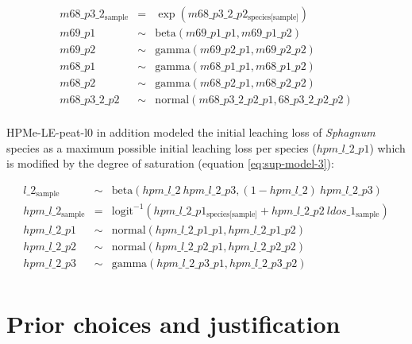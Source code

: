 \documentclass[
  12pt,
]{article}
\begin{document}
\begin{equation}
\begin{aligned}
m68\_p3\_2_{\text{sample}} & = & \exp(m68\_p3\_2\_p2_{\text{species[sample]}})\\
m69\_p1 & \sim & \text{beta}(m69\_p1\_p1, m69\_p1\_p2)\\
m69\_p2 & \sim & \text{gamma}(m69\_p2\_p1, m69\_p2\_p2)\\
m68\_p1 & \sim & \text{gamma}(m68\_p1\_p1, m68\_p1\_p2)\\
m68\_p2 & \sim & \text{gamma}(m68\_p2\_p1, m68\_p2\_p2)\\
m68\_p3\_2\_p2 & \sim & \text{normal}(m68\_p3\_2\_p2\_p1, 68\_p3\_2\_p2\_p2)\\
\label{eq:sup-model-2}
\end{aligned}
\end{equation}

HPMe-LE-peat-l0 in addition modeled the initial leaching loss of \emph{Sphagnum} species as a maximum possible initial leaching loss per species (\(hpm\_l\_2\_p1\)) which is modified by the degree of saturation (equation \eqref{eq:sup-model-3}):

\begin{equation}
\begin{aligned}
l\_2_{\text{sample}} & \sim & \text{beta}(hpm\_l\_2~hpm\_l\_2\_p3, (1 - hpm\_l\_2)~hpm\_l\_2\_p3)\\
hpm\_l\_2_{\text{sample}} & = & \text{logit}^{-1}(hpm\_l\_2\_p1_{\text{species[sample]}} + hpm\_l\_2\_p2~ldos\_1_{\text{sample}})\\
hpm\_l\_2\_p1 & \sim & \text{normal}(hpm\_l\_2\_p1\_p1, hpm\_l\_2\_p1\_p2)\\
hpm\_l\_2\_p2 & \sim & \text{normal}(hpm\_l\_2\_p2\_p1, hpm\_l\_2\_p2\_p2)\\
hpm\_l\_2\_p3 & \sim & \text{gamma}(hpm\_l\_2\_p3\_p1, hpm\_l\_2\_p3\_p2)\\
\label{eq:sup-model-3}
\end{aligned}
\end{equation}

\hypertarget{sup-2}{%
\section{Prior choices and justification}\label{sup-2}}
\end{document}
